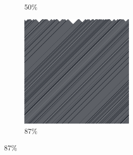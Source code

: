 \documentclass[12pt, fleqn]{report}                             %
\theoremstyle{break}                                            %
\begin{document}
\begin{figure}[ht!]
\begin{subfigure}[b]{0.4\linewidth}
          \caption{50\%}
        \end{subfigure}
        \begin{subfigure}[b]{0.4\linewidth}
          \includegraphics[width=0.6\textwidth]{Images/130/d.png}
          \caption{87\%}
        \end{subfigure}
      \end{figure}
\end{document}
